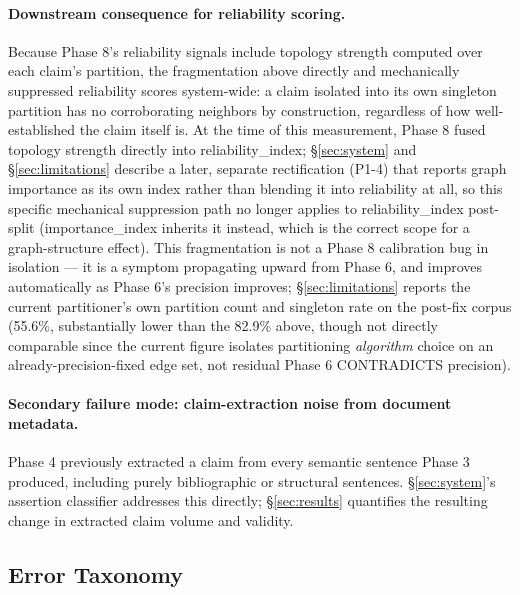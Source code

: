 \paragraph{Downstream consequence for reliability scoring.} Because Phase
8's reliability signals include topology strength computed over each
claim's partition, the fragmentation above directly and mechanically
suppressed reliability scores system-wide: a claim isolated into its own
singleton partition has no corroborating neighbors by construction,
regardless of how well-established the claim itself is. At the time of
this measurement, Phase 8 fused topology strength directly into
reliability\_index; \S\ref{sec:system} and \S\ref{sec:limitations}
describe a later, separate rectification (P1-4) that reports graph
importance as its own index rather than blending it into reliability at
all, so this specific mechanical suppression path no longer applies to
reliability\_index post-split (importance\_index inherits it instead,
which is the correct scope for a graph-structure effect). This
fragmentation is not a Phase 8 calibration bug in isolation --- it is a
symptom propagating upward from Phase 6, and improves automatically as
Phase 6's precision improves; \S\ref{sec:limitations} reports the current
partitioner's own partition count and singleton rate on the post-fix
corpus (55.6\%, substantially lower than the 82.9\% above, though not
directly comparable since the current figure isolates partitioning
\emph{algorithm} choice on an already-precision-fixed edge set, not
residual Phase 6 CONTRADICTS precision).

\paragraph{Secondary failure mode: claim-extraction noise from document
metadata.} Phase 4 previously extracted a claim from every semantic
sentence Phase 3 produced, including purely bibliographic or structural
sentences. \S\ref{sec:system}'s assertion classifier addresses this
directly; \S\ref{sec:results} quantifies the resulting change in extracted
claim volume and validity.

\subsection{Error Taxonomy}
\label{sec:error-taxonomy}

